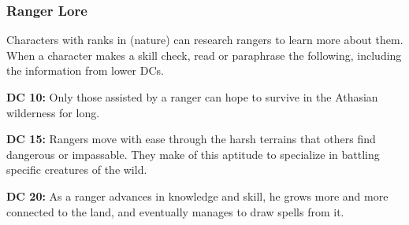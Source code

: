 \subsubsection{Ranger Lore}
Characters with ranks in  (nature) can research rangers to learn more about them. When a character makes a skill check, read or paraphrase the following, including the information from lower DCs.

\textbf{DC 10:} Only those assisted by a ranger can hope to survive in the Athasian wilderness for long.

\textbf{DC 15:} Rangers move with ease through the harsh terrains that others find dangerous or impassable. They make of this aptitude to specialize in battling specific creatures of the wild.

\textbf{DC 20:} As a ranger advances in knowledge and skill, he grows more and more connected to the land, and eventually manages to draw spells from it.
